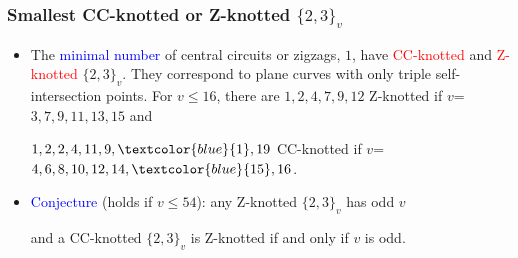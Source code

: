 \documentclass{beamer}
\begin{document}
\begin{frame}\frametitle{Smallest CC-knotted or Z-knotted
$\{2,3\}_v$}
\begin{itemize}
\item 
The \textcolor{blue}{minimal number} of central circuits or zigzags, $1$, have  
\textcolor{red}{CC-knotted} and \textcolor{red}{Z-knotted} 
$\{2,3\}_v$. They correspond to plane curves with   only triple
 self-intersection points.
For $v$$\le$$ 16$, 
there are 
$1,2,4,7,9,12$ Z-knotted if $v$=$3,7,9,11,13,15$ and

$1,2,2,4,11,9,\textcolor{blue}{1},19$ CC-knotted if 
$v$=$4,6,8,10,12, 
14,\textcolor{blue}{15},16$.

\item \textcolor{blue}{Conjecture} (holds if $v$$\le$$54$): any 
Z-knotted  
$\{2,3\}_v$ has 
odd 
$v$

and a CC-knotted  
$\{2,3\}_v$ is  Z-knotted if and only if $v$ is odd.
\end{itemize}


\end{frame}
\end{document}
